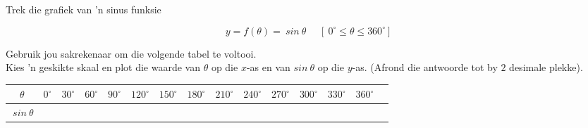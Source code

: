 \begin{wex}
{Trek die grafiek van 'n sinus funksie}
{
\begin{equation*}
  y = f(\theta) = ~sin~\theta~~~~~~[~0^{\circ} \leq \theta \leq 360^{\circ}]
\end{equation*}

Gebruik jou sakrekenaar om die volgende tabel te voltooi.\\
Kies 'n geskikte skaal en plot die waarde van $\theta $ op die $x$-as en van $sin~\theta $ op die $y$-as. (Afrond die antwoorde tot by $2$ desimale plekke). 


\begin{table}[H]


\begin{tabular}{|c|m{0.3cm}|m{0.4cm}|m{0.4cm}|m{0.4cm}|m{0.5cm}|m{0.5cm}|m{0.5cm}|m{0.5cm}|m{0.5cm}|m{0.5cm}|m{0.5cm}|m{0.5cm}|m{0.5cm}|} \hline

\footnotesize$\theta $&
\footnotesize$0^{\circ }$&
\footnotesize$30^{\circ }$&
\footnotesize$60^{\circ }$&
\footnotesize$90^{\circ }$&
\footnotesize$120^{\circ }$&
\footnotesize$150^{\circ }$&
\footnotesize$180^{\circ }$&
\footnotesize$210^{\circ }$&
\footnotesize$240^{\circ }$&
\footnotesize$270^{\circ }$&
\footnotesize$300^{\circ }$&
\footnotesize$330^{\circ }$&
\footnotesize$360^{\circ }$
\\ \hline

\footnotesize$~sin~\theta$&
&
&
&
&
&
&
&
&
&
&
&
&
&

 \hline
\end{tabular}

\end{table}
}
{
\begin{table}[H]

\begin{center}


\end{center}
\end{table}}
\end{wex}
